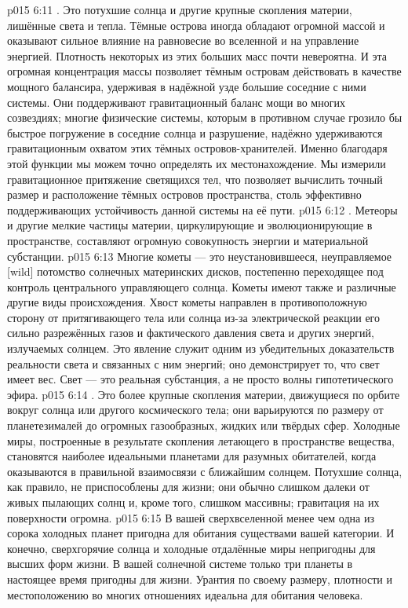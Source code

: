 \vs p015 6:11 \pc {}. Это потухшие солнца и другие крупные скопления материи, лишённые света и тепла. Тёмные острова иногда обладают огромной массой и оказывают сильное влияние на равновесие во вселенной и на управление энергией. Плотность некоторых из этих больших масс почти невероятна. И эта огромная концентрация массы позволяет тёмным островам действовать в качестве мощного балансира, удерживая в надёжной узде большие соседние с ними системы. Они поддерживают гравитационный баланс мощи во многих созвездиях; многие физические системы, которым в противном случае грозило бы быстрое погружение в соседние солнца и разрушение, надёжно удерживаются гравитационным охватом этих тёмных островов\hyp{}хранителей. Именно благодаря этой функции мы можем точно определять их местонахождение. Мы измерили гравитационное притяжение светящихся тел, что позволяет вычислить точный размер и расположение тёмных островов пространства, столь эффективно поддерживающих устойчивость данной системы на её пути.
\vs p015 6:12 \pc {}. Метеоры и другие мелкие частицы материи, циркулирующие и эволюционирующие в пространстве, составляют огромную совокупность энергии и материальной субстанции.
\vs p015 6:13 Многие кометы --- это неустановившееся, неуправляемое [wild] потомство солнечных материнских дисков, постепенно переходящее под контроль центрального управляющего солнца. Кометы имеют также и различные другие виды происхождения. Хвост кометы направлен в противоположную сторону от притягивающего тела или солнца из\hyp{}за электрической реакции его сильно разрежённых газов и фактического давления света и других энергий, излучаемых солнцем. Это явление служит одним из убедительных доказательств реальности света и связанных с ним энергий; оно демонстрирует то, что свет имеет вес. Свет --- это реальная субстанция, а не просто волны гипотетического эфира.
\vs p015 6:14 \pc {}. Это более крупные скопления материи, движущиеся по орбите вокруг солнца или другого космического тела; они варьируются по размеру от планетезималей до огромных газообразных, жидких или твёрдых сфер. Холодные миры, построенные в результате скопления летающего в пространстве вещества, становятся наиболее идеальными планетами для разумных обитателей, когда оказываются в правильной взаимосвязи с ближайшим солнцем. Потухшие солнца, как правило, не приспособлены для жизни; они обычно слишком далеки от живых пылающих солнц и, кроме того, слишком массивны; гравитация на их поверхности огромна.
\vs p015 6:15 В вашей сверхвселенной менее чем одна из сорока холодных планет пригодна для обитания существами вашей категории. И конечно, сверхгорячие солнца и холодные отдалённые миры непригодны для высших форм жизни. В вашей солнечной системе только три планеты в настоящее время пригодны для жизни. Урантия по своему размеру, плотности и местоположению во многих отношениях идеальна для обитания человека.
